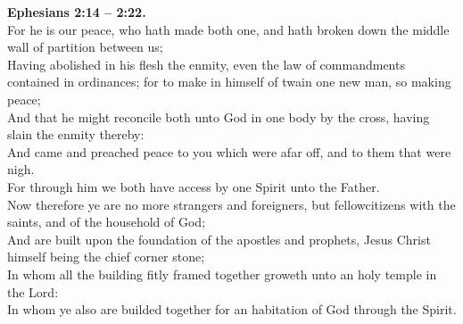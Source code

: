 \documentclass[10pt]{article} %
\begin{document}
{\begin{minipage}[t]{0.45\textwidth}
\textbf{Ephesians 2:14 -- 2:22.}\\
For he is our peace, who hath made both one, and hath broken down the middle wall of partition between us;\\
Having abolished in his flesh the enmity, even the law of commandments contained in ordinances; for to make in himself of twain one new man, so making peace;\\
And that he might reconcile both unto God in one body by the cross, having slain the enmity thereby:\\
And came and preached peace to you which were afar off, and to them that were nigh.\\
For through him we both have access by one Spirit unto the Father.\\
Now therefore ye are no more strangers and foreigners, but fellowcitizens with the saints, and of the household of God;\\
And are built upon the foundation of the apostles and prophets, Jesus Christ himself being the chief corner stone;\\
In whom all the building fitly framed together groweth unto an holy temple in the Lord:\\
In whom ye also are builded together for an habitation of God through the Spirit.\\
\end{minipage}}
\newpage\huge
\doublespacing %
\end{document}

